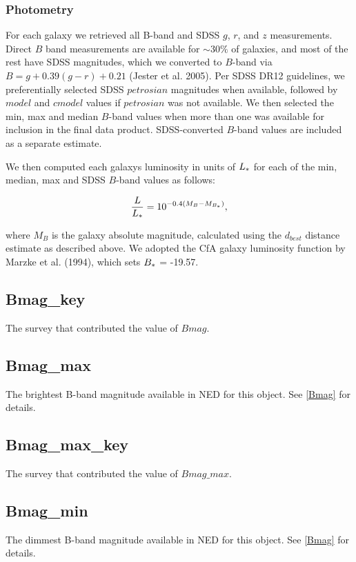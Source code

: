 \documentclass[iop]{emulateapj-rtx4}
\begin{document}
\subsubsection{Photometry}
For each galaxy we retrieved all B-band and SDSS $g$, $r$, and $z$ measurements. Direct $B$ band measurements are available for $\sim 30\%$ of galaxies, and most of the rest have SDSS magnitudes, which we converted to $B$-band via $B = g + 0.39 (g-r) + 0.21$ (Jester et al. 2005). Per SDSS DR12 guidelines, we preferentially selected SDSS $petrosian$ magnitudes when available, followed by $model$ and $cmodel$ values if $petrosian$ was not available. We then selected the min, max and median $B$-band values when more than one was available for inclusion in the final data product. SDSS-converted $B$-band values are included as a separate estimate. 

We then computed each galaxys luminosity in units of $L_{\**}$ for each of the min, median, max and SDSS $B$-band values as follows:

\begin{equation}
	\frac{L}{L_{\**}} = 10^{-0.4 (M_{B} - M_{B_{\**}})},
	\label{lstar}
\end{equation}

where $M_B$ is the galaxy absolute magnitude, calculated using the $d_{best}$ distance estimate as described above. We adopted the CfA galaxy luminosity function by Marzke et al. (1994), which sets $B_{\**} $ = -19.57. 


\subsection{Bmag\_key}
The survey that contributed the value of $Bmag$.

\subsection{Bmag\_max}
The brightest B-band magnitude available in NED for this object. See \ref{Bmag} for details.

\subsection{Bmag\_max\_key}
The survey that contributed the value of $Bmag\_max$.

\subsection{Bmag\_min}
The dimmest B-band magnitude available in NED for this object. See \ref{Bmag} for details.
\end{document}
